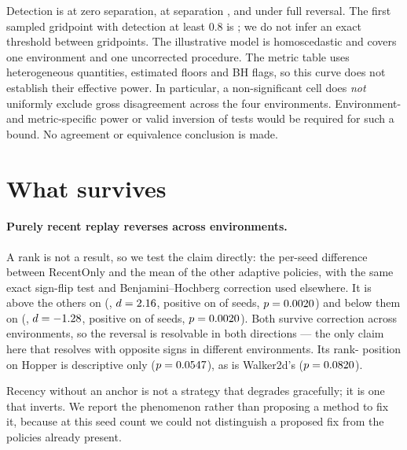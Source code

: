 \documentclass{article}
\begin{document}
Detection is \PowerFalsePos{} at zero separation, \PowerWeakRate{} at
separation \PowerWeakSep{}, and \PowerFullReversal{} under full reversal.
The first sampled gridpoint with detection at least $0.8$ is
\PowerReliableAt{}; we do not infer an exact threshold between gridpoints.
The illustrative model is homoscedastic and covers one environment and one
uncorrected procedure. The metric table uses heterogeneous quantities,
estimated floors and BH flags, so this curve does not establish their
effective power. In particular, a non-significant cell does \emph{not}
uniformly exclude gross disagreement across the four environments.
Environment- and metric-specific power or valid inversion of tests would be
required for such a bound. No agreement or equivalence conclusion is made.

\section{What survives}
\label{sec:domain}

\paragraph{Purely recent replay reverses across environments.} A rank is not a
result, so we test the claim directly: the per-seed difference between
\textsf{RecentOnly} and the mean of the other adaptive policies, with the same
exact sign-flip test and Benjamini--Hochberg correction used elsewhere. It is
above the others on \RevAbove{} (\RoHalfcheetahMean{}, $d = 2.16{}$,
positive on \RoHalfcheetahPos{} of \SeedsHalfcheetah{} seeds,
$p = 0.0020{}$) and below them on \RevBelow{} (\RoAntMean{},
$d = -1.28{}$, positive on \RoAntPos{} of \SeedsAnt{} seeds,
$p = 0.0020{}$). Both survive correction across \RevNTests{} environments, so
the reversal is resolvable in both directions --- the only claim here that
resolves with opposite signs in different environments. Its rank-\RoHopperRank{}
position on Hopper is descriptive only ($p = 0.0547{}$), as is
Walker2d's ($p = 0.0820{}$).

Recency without an anchor is not a strategy that degrades gracefully; it is one
that inverts. We report the phenomenon rather than proposing a method to fix it,
because at this seed count we could not distinguish a proposed fix from the
policies already present.
\end{document}

